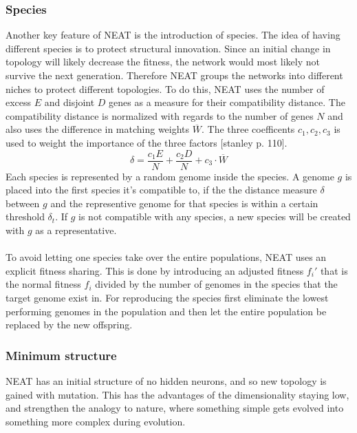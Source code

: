 \documentclass[11pt, a4paper]{article}
\begin{document}
\subsubsection{Species}
Another key feature of NEAT is the introduction  of species. The idea of having different species is to protect structural innovation. Since an initial change in topology will likely decrease the fitness, the network would most likely not survive the next generation. Therefore NEAT groups the networks into different niches to protect different topologies. To do this, NEAT uses the number of excess $ E $ and disjoint $ D $ genes as a measure for their compatibility distance. The compatibility distance is normalized with regards to the number of genes $ N $ and also uses the difference in matching weights $ \overline{W} $. The three coefficents $ c_1, c_2, c_3$ is used to weight the importance of the three factors [stanley p. 110].
\begin{equation}
\delta = \dfrac{c_1E}{N}+\dfrac{c_2D}{N}+c_3\cdot\overline{W}
\end{equation}
Each species is represented by a random genome inside the species. A genome $ g $ is placed into the first species it's compatible to, if the the distance measure $ \delta $ between $ g $ and the representive genome for that species is within a certain threshold $ \delta_t $. If $ g $ is not compatible with any species, a new species will be created with $ g $ as a representative.
\\
\\
To avoid letting one species take over the entire populations, NEAT uses an explicit fitness sharing. This is done by introducing an adjusted fitness $ f_i'$ that is the normal fitness $ f_i $ divided by the number of genomes in the species that the target genome exist in. For reproducing the species first eliminate the lowest performing genomes in the population and then let the entire population be replaced by the new offspring.
\subsubsection{Minimum structure}
NEAT has an initial structure of no hidden neurons, and  so new topology is gained with mutation. This has the advantages of the dimensionality staying low, and strengthen the analogy to nature, where something simple gets evolved into something more complex during evolution.
\end{document}
